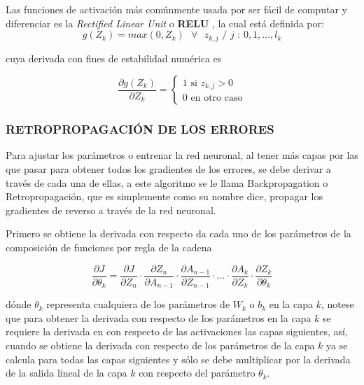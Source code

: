         Las funciones de activación más comúnmente usada por ser fácil de computar y diferenciar es la \textit{Rectified Linear Unit} o \textbf{RELU} \citep{Goodfellow-et-al-2016}, la cual está definida por:
        \begin{equation}
            g(Z_k) = max(0, Z_k) \text{ $\forall$ $z_{k,j}$ / $j$ : $0, 1, ..., l_k$}
        \end{equation}
        
        \noindent cuya derivada con fines de estabilidad numérica es
        
        \begin{equation}
			\frac{\partial g(Z_k)}{\partial Z_k} = 
			\begin{cases}
			\text{1 si } z_{k,j} > 0\\
			\text{0 en otro caso}
			\end{cases}
		\end{equation}
        
        \subsubsection{RETROPROPAGACIÓN DE LOS ERRORES}
        Para ajustar los parámetros o entrenar la red neuronal, al tener más capas por las que pasar para obtener todos los gradientes de los errores, se debe derivar a través de cada una de ellas, a este algoritmo se le llama Backpropagation o Retropropagación, que es simplemente como su nombre dice, propagar los gradientes de reverso a través de la red neuronal.
		
		Primero se obtiene la derivada con respecto da cada uno de los parámetros de la composición de funciones por regla de la cadena
		
		\begin{equation}
		    \frac{\partial J}{\partial \theta_k} = \frac{\partial J}{\partial Z_n} \cdot  \frac{\partial Z_{n}}{\partial A_{n-1}} \cdot \frac{\partial A_{n-1}}{\partial Z_{n-1}} \cdot  \dots \cdot \frac{\partial A_{k}}{\partial Z_{k}} \cdot \frac{\partial Z_{k}}{\partial \theta_{k}}
		\end{equation}
		
		\noindent dónde $\theta_k$ representa cualquiera de los parámetros de $W_k$ o $b_k$ en la capa $k$, notese que para obtener la derivada con respecto de los parámetros en la capa $k$ se requiere la derivada en con respecto de las activaciones las capas siguientes, así, cuando se obtiene la derivada con respecto de los parámetros de la capa $k$ ya se calcula para todas las capas siguientes y sólo se debe multiplicar por la derivada de la salida lineal de la capa $k$ con respecto del parámetro $\theta_k$. \citep{bishop}
		

